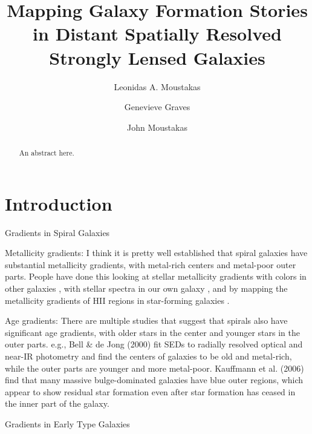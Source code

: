 \message{ !name(clashresolved.tex)}\documentclass{emulateapj}
\begin{document}





\title{Mapping Galaxy Formation Stories in Distant Spatially Resolved Strongly Lensed Galaxies} 

\author{Leonidas A. Moustakas}
\author{Genevieve Graves}
\author{John Moustakas}

\begin{abstract}
An abstract here. 
\end{abstract}

\section{Introduction} 



Gradients in Spiral Galaxies

Metallicity gradients: I think it is pretty well established that
spiral galaxies have substantial metallicity gradients, with
metal-rich centers and metal-poor outer parts.  People have done this
looking at stellar metallicity gradients with colors in other galaxies
\citep[e.g.][]{Bell:00}, with stellar spectra in our own galaxy
\citep[e.g.][]{Ivezic:08}, and by mapping the metallicity gradients
of HII regions in star-forming galaxies \citep[e.g.][]{Zaritsky:94}. 
  
Age gradients: There are multiple studies that suggest that spirals
also have significant age gradients, with older stars in the center
and younger stars in the outer parts.  e.g., Bell \& de Jong (2000)
fit SEDs to radially resolved optical and near-IR photometry and find
the centers of galaxies to be old and metal-rich, while the outer
parts are younger and more metal-poor.  Kauffmann et al. (2006) find
that many massive bulge-dominated galaxies have blue outer regions,
which appear to show residual star formation even after star formation
has ceased in the inner part of the galaxy.

Gradients in Early Type Galaxies
\end{document}
